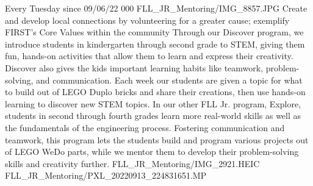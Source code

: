 {Every Tuesday since 09/06/22}
{000}
{FLL_JR_Mentoring/IMG_8857.JPG}
{Create and develop local connections by volunteering for a greater cause; exemplify FIRST's Core Values within the community} 
{Through our Discover program, we introduce students in kindergarten through second grade to STEM, giving them fun, hands-on activities that allow them to learn and express their creativity. Discover also gives the kids important learning habits like teamwork, problem-solving, and communication. Each week our students are given a topic for what to build out of LEGO Duplo bricks and share their creations, then use hands-on learning to discover new STEM topics. In our other FLL Jr. program, Explore, students in second through fourth grades learn more real-world skills as well as the fundamentals of the engineering process. Fostering communication and teamwork, this program lets the students build and program various projects out of LEGO WeDo parts, while we mentor them to develop their problem-solving skills and creativity further.
} 
{FLL_JR_Mentoring/IMG_2921.HEIC}
{FLL_JR_Mentoring/PXL_20220913_224831651.MP}
